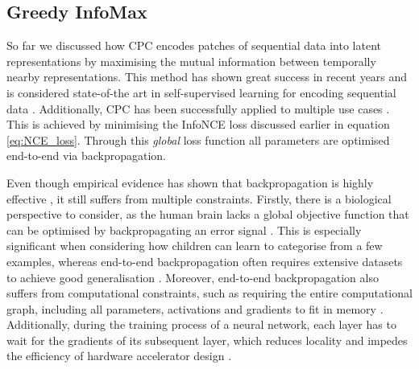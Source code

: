 \subsection{Greedy InfoMax}
	So far we discussed how CPC encodes patches of sequential data into latent representations by maximising the mutual information between temporally nearby representations. This method has shown great success in recent years and is considered state-of-the art in self-supervised learning for encoding sequential data \cite{stackeEvaluationContrastivePredictive2020}. Additionally, CPC has been successfully applied to multiple use cases \cite{stackeEvaluationContrastivePredictive2020, dehaanContrastivePredictiveCoding2021, luSemiSupervisedHistologyClassification2019, bhatiSegmentalContrastivePredictive2021b, deldariTimeSeriesChange2021, henaffDataEfficientImageRecognition2020}. This is achieved by minimising the InfoNCE loss discussed earlier in equation \ref{eq:NCE_loss}. Through this \textit{global} loss function all parameters are optimised end-to-end via backpropagation. 
	
	Even though empirical evidence has shown that backpropagation is highly effective \cite{NIPS2012_c399862d, ioffeBatchNormalizationAccelerating2015}, it still suffers from multiple constraints. Firstly, there is a biological perspective to consider, as the human brain lacks a global objective function that can be optimised by backpropagating an error signal \cite{marblestoneIntegrationDeepLearning2016}. This is especially significant when considering how children can learn to categorise from a few examples, whereas end-to-end backpropagation often requires extensive datasets to achieve good generalisation \cite{lowePuttingEndEndtoEnd2020}. Moreover, end-to-end backpropagation also suffers from computational constraints, such as requiring the entire computational graph, including all parameters, activations and gradients to fit in memory \cite{lowePuttingEndEndtoEnd2020}. Additionally, during the training process of a neural network, each layer has to wait for the gradients of its subsequent layer, which reduces locality and impedes the efficiency of hardware accelerator design \cite{lowePuttingEndEndtoEnd2020}.
		
		
	
